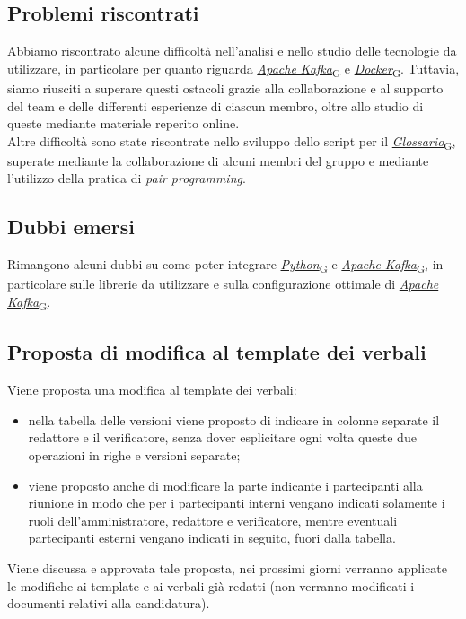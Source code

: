 \documentclass[italian,12pt]{article}
\begin{document}
\subsection{Problemi riscontrati}
Abbiamo riscontrato alcune difficoltà nell'analisi e nello studio delle tecnologie da utilizzare, in particolare per quanto riguarda \href{https://7last.github.io/docs/rtb/documentazione-interna/glossario#apache-kafka}{\textit{Apache Kafka}\textsubscript{G}} e \href{https://7last.github.io/docs/rtb/documentazione-interna/glossario#docker}{\textit{Docker}\textsubscript{G}}. Tuttavia, siamo riusciti a superare questi ostacoli grazie alla collaborazione e al supporto del team e delle differenti esperienze di ciascun membro, oltre allo studio di queste mediante materiale reperito online. \\
Altre difficoltà sono state riscontrate nello sviluppo dello script per il \href{https://7last.github.io/docs/rtb/documentazione-interna/glossario\#glossario}{\textit{Glossario}\textsubscript{G}}, superate mediante la collaborazione di alcuni membri del gruppo e mediante l'utilizzo della pratica di \textit{pair programming}.

\subsection{Dubbi emersi}
Rimangono alcuni dubbi su come poter integrare \href{https://7last.github.io/docs/rtb/documentazione-interna/glossario#python}{\textit{Python}\textsubscript{G}} e \href{https://7last.github.io/docs/rtb/documentazione-interna/glossario#apache-kafka}{\textit{Apache Kafka}\textsubscript{G}}, in particolare sulle librerie da utilizzare e sulla configurazione ottimale di \href{https://7last.github.io/docs/rtb/documentazione-interna/glossario#apache-kafka}{\textit{Apache Kafka}\textsubscript{G}}.

\subsection{Proposta di modifica al template dei verbali}
Viene proposta una modifica al template dei verbali:
\begin{itemize}
	\item nella tabella delle versioni viene proposto di indicare in colonne separate il redattore e il verificatore, senza dover esplicitare ogni volta queste due operazioni in righe e versioni separate;
	\item viene proposto anche di modificare la parte indicante i partecipanti alla riunione in modo che per i partecipanti interni vengano indicati solamente i ruoli dell'amministratore, redattore e verificatore, mentre eventuali partecipanti esterni vengano indicati in seguito, fuori dalla tabella.
\end{itemize}
Viene discussa e approvata tale proposta, nei prossimi giorni verranno applicate le modifiche ai template e ai verbali già redatti (non verranno modificati i documenti relativi alla candidatura).
\end{document}
